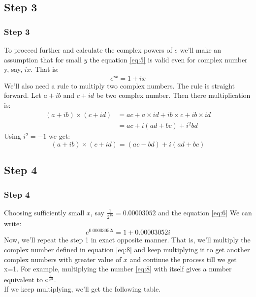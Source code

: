 \documentclass{beamer}
\begin{document}
\subsection{Step 3}
\begin{frame}
    \frametitle{Step 3}
    To proceed further and calculate the complex powers of $e$ we'll make an assumption that for small $y$ the equation \ref{eq:5} is valid even for complex number y, say, $ix$. That is:
    \begin{equation}
        \label{eq:6}
        e^{ix} = 1 + ix
    \end{equation}
\pause
We'll also need a rule to multiply two complex numbers. The rule is straight forward. Let $a+ib$ and $c+id$ be two complex number. Then there multiplication is:
\begin{equation*}
    \begin{split}
        (a+ib)\times (c+id) &=ac + a\times id + ib\times c + ib\times id \\
        &=ac + i(ad+bc) + i^2bd
    \end{split}
\end{equation*}
Using $i^2 = -1$ we get:
\begin{equation}
    \label{eq:7}
    (a+ib)\times (c+id) = (ac-bd) + i(ad+bc)
\end{equation}
\end{frame}

\subsection{Step 4}
\begin{frame}
    \frametitle{Step 4}
 Choosing sufficiently small $x$, say $\frac{1}{2^{15}} = 0.00003052$ and the equation \ref{eq:6} We can write:
    \begin{equation}
        \label{eq:8}
        e^{0.00003052i} = 1 + 0.00003052i
    \end{equation}
\pause
Now, we'll repeat the step 1 in exact opposite manner. That is, we'll multiply the complex number defined in equation \ref{eq:8} and keep multiplying it to get another complex numbers with greater value of $x$ and continue the process till we get x=1. For example, multiplying the number \ref{eq:8} with itself gives a number equivalent to $e^{\frac{i}{2^{14}}}$. \\ If we keep multiplying, we'll get the following table.
\end{frame}
\end{document}
